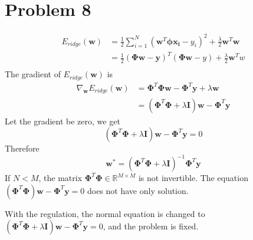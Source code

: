 \documentclass[12pt]{scrartcl}
\newcommand{\vect}[1]{\boldsymbol{#1}}
\newcommand{\ve}{\vect}
\begin{document}
    
  \section*{Problem 8}
  \[
      \begin{aligned}
        E_{ridge}\left( \ve{w} \right) &=   \frac{1}{2} \sum^{N}_{i=1} \left( \ve{w}^{T} \ve{\phi}\ve{x_i} - y_i \right) ^{2} + \frac{\lambda}{2}\ve{w}^{T}\ve{w} \\ &= \frac{1}{2}\left( \ve{\Phi w} - \ve{y} \right) ^{T}\left( \ve{\Phi w}- y \right)  + \frac{\lambda}{2}\ve{w}^{T}w  \\
      \end{aligned}
  \] 
  The gradient of $E_{ridge}\left( \ve{w} \right)$ is
  \[
      \begin{aligned}
  \nabla _{\ve{w}}E_{ridge}\left( \ve{w} \right) &=  \ve{\Phi}^{T}\ve{\Phi w}  - \ve{\Phi}^{T}\ve{y} + \lambda \ve{w} \\ &= \left( \ve{\Phi}^{T}\ve{\Phi} + \lambda \ve{I} \right) \ve{w} - \ve{\Phi}^{T}\ve{y} 
      \end{aligned}
  \] 
  Let the gradient be zero, we get 
  \[
   \left( \ve{\Phi}^{T}\ve{\Phi} + \lambda \ve{I} \right) \ve{w} - \ve{\Phi}^{T}\ve{y} = 0 
  \] 
  Therefore
  \[
  \ve{w^{*}} = \left( \ve{\Phi}^{T}\ve{\Phi} + \lambda \ve{I} \right) ^{-1}\ve{\Phi}^{T}\ve{y}  
  \] 
  If $N < M$, the matrix $\ve{\Phi}^{T}\ve{\Phi} \in \mathbb{R}^{M\times M}$ is not invertible. The equation $   \left( \ve{\Phi}^{T}\ve{\Phi} \right) \ve{w} - \ve{\Phi}^{T}\ve{y} = 0 
$ does not have only solution.

    With the regulation, the normal equation is changed to $\left( \ve{\Phi}^{T}\ve{\Phi} + \lambda \ve{I} \right) \ve{w} - \ve{\Phi}^{T}\ve{y} = 0$, and the problem is fixed.
\end{document}

